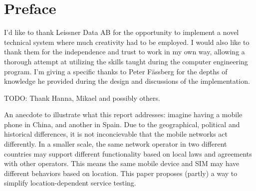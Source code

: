 \thispagestyle{plain}

\section*{Preface}

I'd like to thank Leissner Data AB for the opportunity to implement
a novel technical system where much creativity had to be employed.
I would also like to thank them for the independence and trust to
work in my own way, allowing a thorough attempt at utilizing the
skills taught during the computer engineering program. I'm giving a
specific thanks to Peter Fässberg for the depths of knowledge he
provided during the design and discussions of the implementation.

TODO: Thank Hanna, Mikael and possibly others.

An anecdote to illustrate what this report addresses:
imagine having a mobile phone in China, and another in Spain. Due
to the geographical, political and historical differences, it is
not inconcievable that the mobile networks act differently. In a
smaller scale, the same network operator in two different countries
may support different functionality based on local laws and
agreements with other operators. This means the same mobile device
and SIM may have different behaviors based on location. This paper
proposes (partly) a way to simplify location-dependent service
testing.
